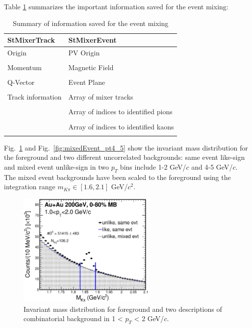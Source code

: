 Table \ref{eventBuf} summarizes the important information saved for the event mixing:

\begin{table}[htp]
\centering
\caption{Summary of information saved for the event mixing}
\label{eventBuf}
\begin{tabular}{ l | l  }
\toprule[1.6pt]
StMixerTrack & StMixerEvent \\
\midrule[1.2pt]
Origin & PV Origin \\
\\
Momentum & Magnetic Field \\
\\
Q-Vector & Event Plane \\
\\
Track information & Array of mixer tracks \\
\\
  &Array of indices to identified pions \\
\\
  & Array of indices to identified kaons \\
\\
\bottomrule[1.6pt]
\end{tabular}
\end{table}

Fig.~\ref{fig:mixedEvent_pt1_2} and Fig.~\ref{fig:mixedEvent_pt4_5} show the invariant mass distribution for the foreground and two different uncorrelated backgrounds: same event like-sign and mixed event unlike-sign in two $p_T$ bins include 1-2 GeV/$c$ and 4-5 GeV/$c$. The mixed event backgrounds have been scaled to the foreground using the integration range $m_{K\pi}\in[1.6,2.1]$ GeV/$c^{2}$.

\begin{figure}[htbp]
\centering
\includegraphics[keepaspectratio,width=0.6\textwidth]{figure/Run14_D0HFT/Mixed_cent_1_9_pt_1_2.eps}
\caption{Invariant mass distribution for foreground and two descriptions of combinatorial background in 1 < $p_T$ < 2 GeV/$c$.}
\label{fig:mixedEvent_pt1_2}
\end{figure}

